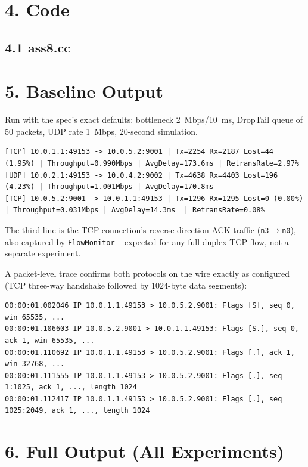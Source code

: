 \documentclass[11pt]{article}
\begin{document}
\section*{4. Code}
\subsection*{4.1 ass8.cc}


\section*{5. Baseline Output}
Run with the spec's exact defaults: bottleneck 2~Mbps/10~ms, DropTail queue
of 50 packets, UDP rate 1~Mbps, 20-second simulation.
\begin{lstlisting}[style=outstyle]
[TCP] 10.0.1.1:49153 -> 10.0.5.2:9001 | Tx=2254 Rx=2187 Lost=44 (1.95%) | Throughput=0.990Mbps | AvgDelay=173.6ms | RetransRate=2.97%
[UDP] 10.0.2.1:49153 -> 10.0.4.2:9002 | Tx=4638 Rx=4403 Lost=196 (4.23%) | Throughput=1.001Mbps | AvgDelay=170.8ms
[TCP] 10.0.5.2:9001 -> 10.0.1.1:49153 | Tx=1296 Rx=1295 Lost=0 (0.00%) | Throughput=0.031Mbps | AvgDelay=14.3ms  | RetransRate=0.08%
\end{lstlisting}
The third line is the TCP connection's reverse-direction ACK traffic
(\texttt{n3}$\to$\texttt{n0}), also captured by \texttt{FlowMonitor} --
expected for any full-duplex TCP flow, not a separate experiment.

A packet-level trace confirms both protocols on the wire exactly as
configured (TCP three-way handshake followed by 1024-byte data segments):
\begin{lstlisting}[style=outstyle]
00:00:01.002046 IP 10.0.1.1.49153 > 10.0.5.2.9001: Flags [S], seq 0, win 65535, ...
00:00:01.106603 IP 10.0.5.2.9001 > 10.0.1.1.49153: Flags [S.], seq 0, ack 1, win 65535, ...
00:00:01.110692 IP 10.0.1.1.49153 > 10.0.5.2.9001: Flags [.], ack 1, win 32768, ...
00:00:01.111555 IP 10.0.1.1.49153 > 10.0.5.2.9001: Flags [.], seq 1:1025, ack 1, ..., length 1024
00:00:01.112417 IP 10.0.1.1.49153 > 10.0.5.2.9001: Flags [.], seq 1025:2049, ack 1, ..., length 1024
\end{lstlisting}

\section*{6. Full Output (All Experiments)}

\end{document}
